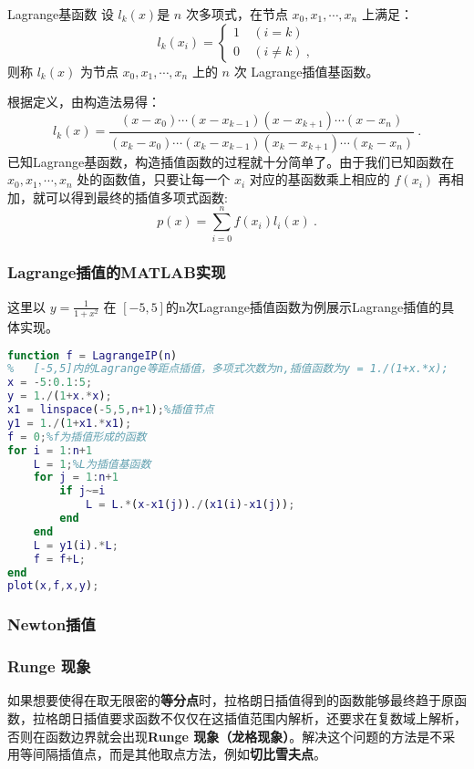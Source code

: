 \begin{definition}{Lagrange基函数}
设 $l_k(x)$是 $n$ 次多项式，在节点 $x_0, x_1,\cdots,x_n$ 上满足：
\begin{equation}
l_k(x_i) = 
\begin{cases}
1\ &(i = k)\\
0 \ &(i \neq k)~,
\end{cases}
\end{equation}
则称 $l_k(x)$ 为节点 $x_0,x_1,\cdots,x_n$ 上的 $n$ 次 Lagrange插值基函数。
\end{definition}
根据定义，由构造法易得：
\begin{equation}
l_k(x) = \frac{(x-x_0)\cdots(x-x_{k-1})(x-x_{k+1})\cdots (x-x_n)}{(x_k-x_0)\cdots(x_k-x_{k-1})(x_k-x_{k+1})\cdots(x_k-x_n)}~.
\end{equation}
已知Lagrange基函数，构造插值函数的过程就十分简单了。由于我们已知函数在 $x_0,x_1,\cdots,x_n$ 处的函数值，只要让每一个 $x_i$ 对应的基函数乘上相应的 $f(x_i)$ 再相加，就可以得到最终的插值多项式函数:
\begin{equation}
p(x) = \sum_{i = 0}^n f(x_i)l_i(x) ~.
\end{equation}
\subsubsection{Lagrange插值的MATLAB实现}
这里以 $y = \frac{1}{1+x^2}$ 在 $[-5,5]$的n次Lagrange插值函数为例展示Lagrange插值的具体实现。
\begin{lstlisting}[language=matlab]
function f = LagrangeIP(n)
%   [-5,5]内的Lagrange等距点插值，多项式次数为n,插值函数为y = 1./(1+x.*x);
x = -5:0.1:5;
y = 1./(1+x.*x);
x1 = linspace(-5,5,n+1);%插值节点
y1 = 1./(1+x1.*x1);
f = 0;%f为插值形成的函数
for i = 1:n+1
    L = 1;%L为插值基函数
    for j = 1:n+1
        if j~=i
            L = L.*(x-x1(j))./(x1(i)-x1(j));
        end
    end
    L = y1(i).*L;
    f = f+L;
end
plot(x,f,x,y);
\end{lstlisting}
\subsubsection{Newton插值}

\subsubsection{Runge 现象}
如果想要使得在取无限密的\textbf{等分点}时，拉格朗日插值得到的函数能够最终趋于原函数，拉格朗日插值要求函数不仅仅在这插值范围内解析，还要求在复数域上解析，否则在函数边界就会出现\textbf{Runge 现象（龙格现象）}。解决这个问题的方法是不采用等间隔插值点，而是其他取点方法，例如\textbf{切比雪夫点}。

